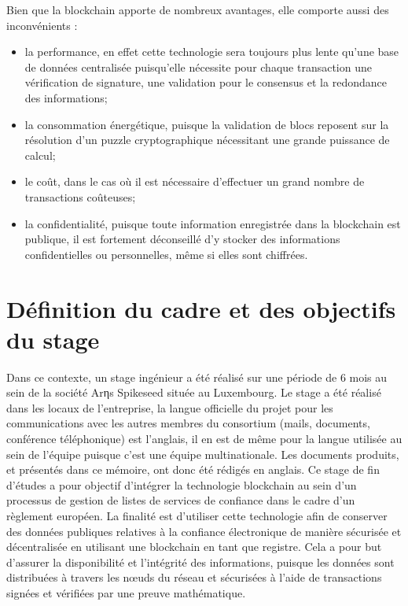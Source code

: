 \documentclass{tnreport}
\begin{document}
Bien que la blockchain apporte de nombreux avantages, elle comporte aussi des inconvénients :
\begin{itemize}
	\item la performance, en effet cette technologie sera toujours plus lente qu'une base de données centralisée puisqu'elle nécessite pour chaque transaction une vérification de signature, une validation pour le consensus et la redondance des informations; 
	\item la consommation énergétique, puisque la validation de blocs reposent sur la résolution d'un puzzle cryptographique nécessitant une grande puissance de calcul; 
	\item le coût, dans le cas où il est nécessaire d'effectuer un grand nombre de transactions coûteuses;
	\item la confidentialité, puisque toute information enregistrée dans la blockchain est publique, il est fortement déconseillé d'y stocker des informations confidentielles ou personnelles, même si elles sont chiffrées.
\end{itemize}

\section{Définition du cadre et des objectifs du stage}

Dans ce contexte, un stage ingénieur a été réalisé sur une période de 6 mois au sein de la société Arηs Spikeseed située au Luxembourg. 
Le stage a été réalisé dans les locaux de l'entreprise, la langue officielle du projet pour les communications avec les autres membres du consortium (mails, documents, conférence téléphonique) est l’anglais, il en est de même pour la langue utilisée au sein de l'équipe puisque c'est une équipe multinationale. Les documents produits, et présentés dans ce mémoire, ont donc été rédigés en anglais.
Ce stage de fin d'études a pour objectif d'intégrer la technologie blockchain au sein d'un processus de gestion de listes de services de confiance dans le cadre d'un règlement européen. 
La finalité est d'utiliser cette technologie afin de conserver des données publiques relatives à la confiance électronique de manière sécurisée et décentralisée en utilisant une blockchain en tant que registre.
Cela a pour but d'assurer la disponibilité et l'intégrité des informations, puisque les données sont distribuées à travers les nœuds du réseau et sécurisées à l'aide de transactions signées et vérifiées par une preuve mathématique. 
\end{document}
